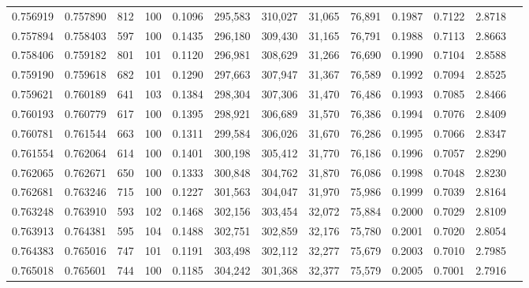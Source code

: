 \begin{tabular}{rrrrrrrrrrrrr}
0.756919 & 0.757890 &   812 & 100 &                                     0.1096 & 295,583 & 310,027 &  31,065 &  76,891 & 0.1987 & 0.7122 & 2.8718 \\
0.757894 & 0.758403 &   597 & 100 &                                     0.1435 & 296,180 & 309,430 &  31,165 &  76,791 & 0.1988 & 0.7113 & 2.8663 \\
0.758406 & 0.759182 &   801 & 101 &                                     0.1120 & 296,981 & 308,629 &  31,266 &  76,690 & 0.1990 & 0.7104 & 2.8588 \\
0.759190 & 0.759618 &   682 & 101 &                                     0.1290 & 297,663 & 307,947 &  31,367 &  76,589 & 0.1992 & 0.7094 & 2.8525 \\
0.759621 & 0.760189 &   641 & 103 &                                     0.1384 & 298,304 & 307,306 &  31,470 &  76,486 & 0.1993 & 0.7085 & 2.8466 \\
0.760193 & 0.760779 &   617 & 100 &                                     0.1395 & 298,921 & 306,689 &  31,570 &  76,386 & 0.1994 & 0.7076 & 2.8409 \\
0.760781 & 0.761544 &   663 & 100 &                                     0.1311 & 299,584 & 306,026 &  31,670 &  76,286 & 0.1995 & 0.7066 & 2.8347 \\
0.761554 & 0.762064 &   614 & 100 &                                     0.1401 & 300,198 & 305,412 &  31,770 &  76,186 & 0.1996 & 0.7057 & 2.8290 \\
0.762065 & 0.762671 &   650 & 100 &                                     0.1333 & 300,848 & 304,762 &  31,870 &  76,086 & 0.1998 & 0.7048 & 2.8230 \\
0.762681 & 0.763246 &   715 & 100 &                                     0.1227 & 301,563 & 304,047 &  31,970 &  75,986 & 0.1999 & 0.7039 & 2.8164 \\
0.763248 & 0.763910 &   593 & 102 &                                     0.1468 & 302,156 & 303,454 &  32,072 &  75,884 & 0.2000 & 0.7029 & 2.8109 \\
0.763913 & 0.764381 &   595 & 104 &                                     0.1488 & 302,751 & 302,859 &  32,176 &  75,780 & 0.2001 & 0.7020 & 2.8054 \\
0.764383 & 0.765016 &   747 & 101 &                                     0.1191 & 303,498 & 302,112 &  32,277 &  75,679 & 0.2003 & 0.7010 & 2.7985 \\
0.765018 & 0.765601 &   744 & 100 &                                     0.1185 & 304,242 & 301,368 &  32,377 &  75,579 & 0.2005 & 0.7001 & 2.7916 \\

\end{tabular}

